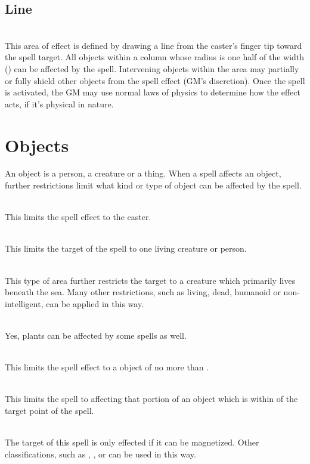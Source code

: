 \begin{multicols*}{2}
\subsection{Line}
\\
This area of effect is defined by drawing a line from the caster's finger tip  toward the spell target. All objects within a column whose radius is one half of the width () can be affected by the spell. Intervening objects within the area may partially or fully shield other objects from the spell effect (GM's discretion). Once the spell is activated, the GM may use normal laws of physics to determine how the effect acts, if it's physical in nature.
\section{Objects}
An object is a person, a creature or a thing. When a spell affects an object, further restrictions limit what kind or type of object can be affected by the spell.

\\
This limits the spell effect to the caster.

\\
This limits the target of the spell to one living creature or person.

\\
This type of area further restricts the target to a creature which primarily lives beneath the sea. Many other restrictions, such as living, dead, humanoid or non-intelligent, can be applied in this way.

\\
Yes, plants can be affected by some spells as well.

\\
This limits the spell effect to a  object of no more than .

\\
This limits the spell to affecting that portion of an object which is within  of the target point of the spell.

\\
The target of this spell is only effected if it can be magnetized. Other classifications, such as , ,  or  can be used in this way.

\end{multicols*}
